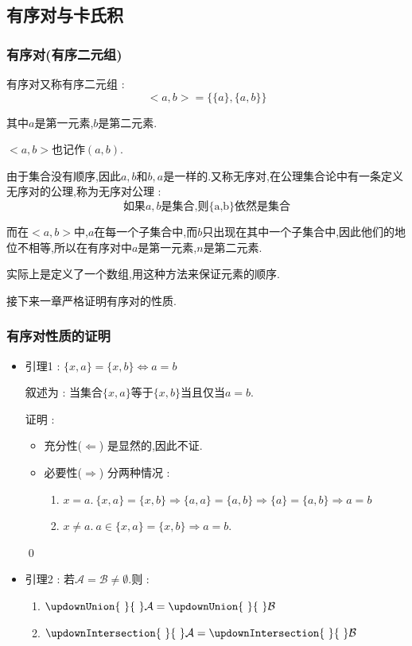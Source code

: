 {{\subsection{有序对与卡氏积}{

  \subsubsection{有序对(有序二元组)}{
    有序对又称有序二元组 : $$
      <a,b> = \{\{a\},\{a,b\}\}
    $$

    其中$a$是第一元素,$b$是第二元素.

    $<a,b>$也记作$(a,b)$.

    由于集合没有顺序,因此${a,b}$和${b,a}$是一样的.又称无序对,在公理集合论中有一条定义无序对的公理,称为无序对公理 : $$
      \mbox{如果$a,b$是集合,则\{a,b\}依然是集合}
    $$

    而在$<a,b>$中,$a$在每一个子集合中,而$b$只出现在其中一个子集合中,因此他们的地位不相等,所以在有序对中$a$是第一元素,$n$是第二元素.

    实际上是定义了一个数组,用这种方法来保证元素的顺序.

    接下来一章严格证明有序对的性质.
  }%

  \subsubsection{有序对性质的证明}{
    \begin{itemize}
      \item {
            引理1 : $\{x,a\} = \{x,b\} \Leftrightarrow a = b$

            叙述为 : 当集合$\{x,a\}$等于$\{x,b\}$当且仅当$a = b$.

            证明 : \begin{itemize}
              \item 充分性($\Leftarrow$) 是显然的,因此不证.
              \item 必要性($\Rightarrow$) 分两种情况 : \begin{enumerate}
                      \item $x = a.\ \{x,a\} = \{x,b\} \Rightarrow \{a,a\} = \{a,b\} \Rightarrow \{a\} = \{a,b\} \Rightarrow a = b$
                      \item $x \neq a.\ a \in \{x,a\} = \{x,b\} \Rightarrow a = b$.
                    \end{enumerate}
            \end{itemize}

            \qed
            }
      \item {
            引理2 : 若$\mathcal{A} = \mathcal{B} \neq \emptyset$.则 : \begin{enumerate}
              \item $\updownUnion{~}{~}\mathcal{A} = \updownUnion{~}{~}\mathcal{B}$
              \item $\updownIntersection{~}{~}\mathcal{A} = \updownIntersection{~}{~}\mathcal{B}$
            \end{enumerate}

}
\end{itemize}}}}}
